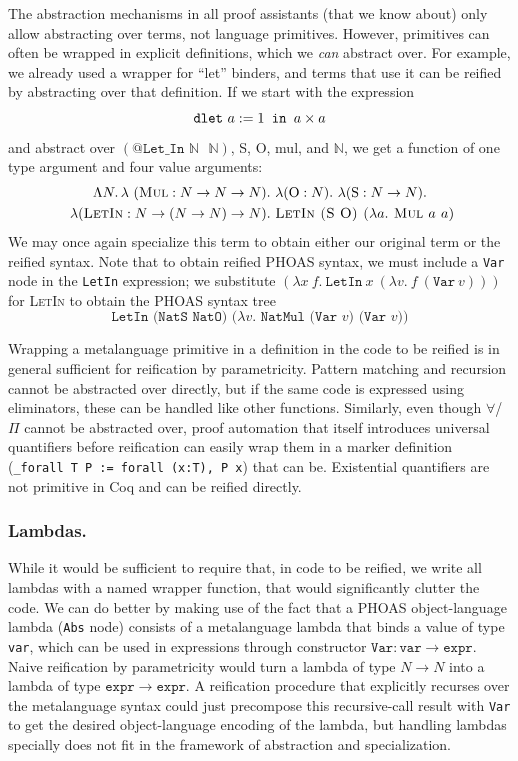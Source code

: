 The abstraction mechanisms in all proof assistants (that we know about) only allow abstracting over terms, not language primitives.
However, primitives can often be wrapped in explicit definitions, which we \emph{can} abstract over.
For example, we already used a wrapper for ``let'' binders, and terms that use it can be reified by abstracting over that definition.
If we start with the expression
\[
\text{\texttt{dlet} }a := 1\texttt{ in }a \times a
\]
and abstract over $(\texttt{@Let\_In $\mathbb N$ $\mathbb N$})$, S, O, mul, and $\mathbb{N}$,
we get a function of one type argument and four value arguments:
\begin{multline*}
\Lambda N.\,\lambda
\ (\textsc{Mul} : N \to N \to N).
\ \lambda (\text{O} : N).
\ \lambda (\text{S} : N \to N). \\
\ \lambda (\textsc{LetIn} : N \to (N\to N)\to N).
\ \textsc{LetIn (S O) ($\lambda a.$ Mul $a$ $a$)}
\end{multline*}
We may once again specialize this term to obtain either our original term or the reified syntax.
Note that to obtain reified PHOAS syntax, we must include a \texttt{Var} node in the \texttt{LetIn} expression; we substitute $(\lambda x\ f.\ \texttt{LetIn}\ x\ (\lambda v.\ f\ (\texttt{Var}\ v)))$ for \textsc{LetIn} to obtain the PHOAS syntax tree
\[
  \texttt{LetIn (NatS NatO) ($\lambda v.$ NatMul (Var $v$) (Var $v$))}
\]

Wrapping a metalanguage primitive in a definition in the code to be reified is in general sufficient for reification by parametricity.
Pattern matching and recursion cannot be abstracted over directly, but if the same code is expressed using eliminators, these can be handled like other functions.
Similarly, even though $\forall$/$\Pi$ cannot be abstracted over, proof automation that itself introduces universal quantifiers before reification can easily wrap them in a marker definition (\texttt{\_forall T P := forall (x:T), P x}) that can be.
Existential quantifiers are not primitive in Coq and can be reified directly.

\subsubsection{Lambdas.}\label{sec:walkthrough-lambdas}

While it would be sufficient to require that, in code to be reified, we write all lambdas with a named wrapper function, that would significantly clutter the code.
We can do better by making use of the fact that a PHOAS object-language lambda (\texttt{Abs} node) consists of a metalanguage lambda that binds a value of type \texttt{var}, which can be used in expressions through constructor $\mathtt{Var} : \mathtt{var} \to \mathtt{expr}$.
Naive reification by parametricity would turn a lambda of type $N \to N$ into a lambda of type $\mathtt{expr} \to \mathtt{expr}$.
A reification procedure that explicitly recurses over the metalanguage syntax could just precompose this recursive-call result with \texttt{Var} to get the desired object-language encoding of the lambda, but handling lambdas specially does not fit in the framework of abstraction and specialization.

